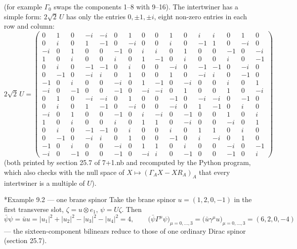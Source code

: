 \documentclass[10pt,a4paper]{article}
\makeatletter
\renewcommand\subsubsection{\@startsection{subsubsection}{3}{\z@}{-3.25ex\@plus -1ex \@minus -.2ex}{1.5ex \@plus .2ex}{\normalfont\normalsize\bfseries\raggedright}}
\makeatother
\begin{document}
(for example $\Gamma_0$ swaps the components 1–8 with 9–16). The intertwiner has a simple form: $2\sqrt2\,U$ has only the entries $0,\pm1,\pm i$, eight non-zero entries in each row and column:
\begin{equation*}
2\sqrt2\,U=\left(\begin{smallmatrix}0 & 1 & 0 & -i & -i & 0 & 1 & 0 & 0 & 1 & 0 & i & i & 0 & 1 & 0 \\ 0 & i & 0 & 1 & -1 & 0 & -i & 0 & 0 & i & 0 & -1 & 1 & 0 & -i & 0 \\ -i & 0 & 1 & 0 & 0 & -1 & 0 & i & i & 0 & 1 & 0 & 0 & -1 & 0 & -i \\ 1 & 0 & i & 0 & 0 & i & 0 & 1 & -1 & 0 & i & 0 & 0 & i & 0 & -1 \\ 0 & i & 0 & -1 & -1 & 0 & i & 0 & 0 & -i & 0 & -1 & -1 & 0 & -i & 0 \\ 0 & -1 & 0 & -i & i & 0 & 1 & 0 & 0 & 1 & 0 & -i & i & 0 & -1 & 0 \\ -1 & 0 & i & 0 & 0 & -i & 0 & 1 & -1 & 0 & -i & 0 & 0 & i & 0 & 1 \\ -i & 0 & -1 & 0 & 0 & -1 & 0 & -i & -i & 0 & 1 & 0 & 0 & 1 & 0 & -i \\ 0 & 1 & 0 & -i & -i & 0 & 1 & 0 & 0 & -1 & 0 & -i & -i & 0 & -1 & 0 \\ 0 & i & 0 & 1 & -1 & 0 & -i & 0 & 0 & -i & 0 & 1 & -1 & 0 & i & 0 \\ -i & 0 & 1 & 0 & 0 & -1 & 0 & i & -i & 0 & -1 & 0 & 0 & 1 & 0 & i \\ 1 & 0 & i & 0 & 0 & i & 0 & 1 & 1 & 0 & -i & 0 & 0 & -i & 0 & 1 \\ 0 & i & 0 & -1 & -1 & 0 & i & 0 & 0 & i & 0 & 1 & 1 & 0 & i & 0 \\ 0 & -1 & 0 & -i & i & 0 & 1 & 0 & 0 & -1 & 0 & i & -i & 0 & 1 & 0 \\ -1 & 0 & i & 0 & 0 & -i & 0 & 1 & 1 & 0 & i & 0 & 0 & -i & 0 & -1 \\ -i & 0 & -1 & 0 & 0 & -1 & 0 & -i & i & 0 & -1 & 0 & 0 & -1 & 0 & i\end{smallmatrix}\right)
\end{equation*}
(both printed by section 25.7 of 7+1.nb and recomputed by the Python program, which also checks with the null space of $X\mapsto(\Gamma_AX-XR_A)_A$ that every intertwiner is a multiple of $U$).

\subsubsection*{Example 9.2 — one brane spinor}
Take the brane spinor $u=(1,2,0,-1)$ in the first transverse slot, $\zeta=u\otimes e_1$, $\psi=U\zeta$. Then
\begin{equation*}
\bar\psi\psi=\bar uu=|u_1|^2+|u_2|^2-|u_3|^2-|u_4|^2=4,\qquad \big(\bar\psi\Gamma^\mu\psi\big)_{\mu=0,\dots,3}=\big(\bar u\gamma^\mu u\big)_{\mu=0,\dots,3}=(6, 2, 0, -4)
\end{equation*}
— the sixteen-component bilinears reduce to those of one ordinary Dirac spinor (section 25.7).
\end{document}
